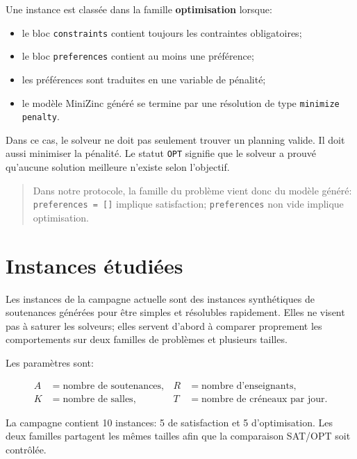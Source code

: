 \documentclass[12pt,a4paper]{article}
\newcommand{\mzn}{MiniZinc}
\newcommand{\opt}{\texttt{OPT}}
\begin{document}
Une instance est classée dans la famille \textbf{optimisation} lorsque:

\begin{itemize}
  \item le bloc \texttt{constraints} contient toujours les contraintes obligatoires;
  \item le bloc \texttt{preferences} contient au moins une préférence;
  \item les préférences sont traduites en une variable de pénalité;
  \item le modèle \mzn{} généré se termine par une résolution de type
  \texttt{minimize penalty}.
\end{itemize}

Dans ce cas, le solveur ne doit pas seulement trouver un planning valide. Il doit aussi minimiser la pénalité. Le statut \opt{} signifie que le solveur a prouvé qu'aucune solution meilleure n'existe selon l'objectif.

\begin{quote}
Dans notre protocole, la famille du problème vient donc du modèle généré: \texttt{preferences = []} implique satisfaction; \texttt{preferences} non vide implique optimisation.
\end{quote}

\section{Instances étudiées}

Les instances de la campagne actuelle sont des instances synthétiques de soutenances générées pour être simples et résolubles rapidement. Elles ne visent pas à saturer les solveurs; elles servent d'abord à comparer proprement les comportements sur deux familles de problèmes et plusieurs tailles.

Les paramètres sont:

\begin{align*}
A &= \text{nombre de soutenances}, &
R &= \text{nombre d'enseignants},\\
K &= \text{nombre de salles}, &
T &= \text{nombre de créneaux par jour}.
\end{align*}

La campagne contient 10 instances: 5 de satisfaction et 5 d'optimisation. Les deux familles partagent les mêmes tailles afin que la comparaison SAT/OPT soit contrôlée.
\end{document}
